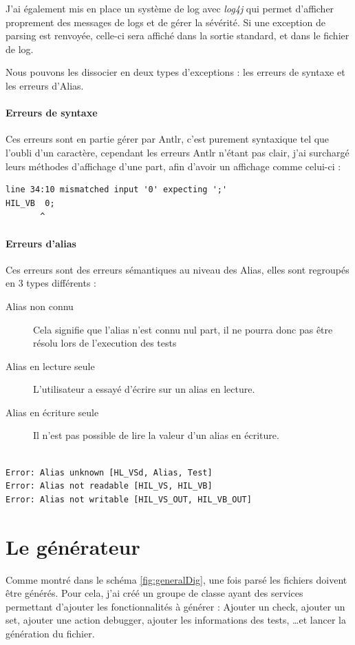 J'ai également mis en place un système de log avec \textit{log4j} qui permet d'afficher proprement des messages de logs et de gérer la sévérité. Si une exception de parsing est renvoyée, celle-ci sera affiché dans la sortie standard, et dans le fichier de log.

Nous pouvons les dissocier en deux types d'exceptions : les erreurs de syntaxe et les erreurs d'Alias. 
\paragraph{Erreurs de syntaxe} Ces erreurs sont en partie gérer par Antlr, c'est purement syntaxique tel que l'oubli d'un caractère, cependant les erreurs Antlr n'étant pas clair, j'ai surchargé leurs méthodes d'affichage d'une part, afin d'avoir un affichage comme celui-ci : 
\begin{lstlisting}[caption=Affichage d'une erreur de syntaxe, numbers=none]
line 34:10 mismatched input '0' expecting ';'
HIL_VB  0;
       ^
\end{lstlisting}


\paragraph{Erreurs d'alias} Ces erreurs sont des erreurs sémantiques au niveau des Alias, elles sont regroupés en 3 types différents : 
\begin{description}
	\item[Alias non connu] Cela signifie que l'alias n'est connu nul part, il ne pourra donc pas être résolu lors de l'execution des tests
	\item[Alias en lecture seule] L'utilisateur a essayé d'écrire sur un alias en lecture.
	\item[Alias en écriture seule] Il n'est pas possible de lire la valeur d'un alias en écriture.\\~
\end{description}

\begin{lstlisting}[caption=Affichage d'une erreur d'alias, numbers=none]
Error: Alias unknown [HL_VSd, Alias, Test]
Error: Alias not readable [HIL_VS, HIL_VB]
Error: Alias not writable [HIL_VS_OUT, HIL_VB_OUT]
\end{lstlisting}
		
	\section{Le générateur}
	Comme montré dans le schéma \ref{fig:generalDig}, une fois parsé les fichiers doivent être générés. Pour cela, j'ai créé un groupe de classe ayant des services permettant d'ajouter les fonctionnalités à générer : Ajouter un check, ajouter un set, ajouter une action debugger, ajouter les informations des tests, \ldots et lancer la génération du fichier.

